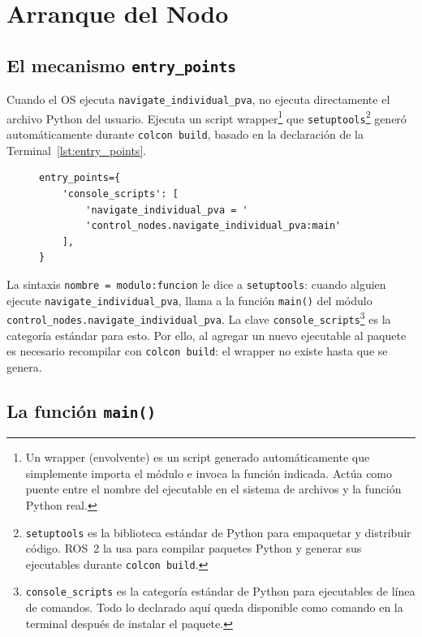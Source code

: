 \section{Arranque del Nodo}

\subsection{El mecanismo \texttt{entry\_points}}

Cuando el OS ejecuta \texttt{navigate\_individual\_pva}, no ejecuta directamente el archivo Python del usuario. Ejecuta un script wrapper\footnote{Un wrapper (envolvente) es un script generado automáticamente que simplemente importa el módulo e invoca la función indicada. Actúa como puente entre el nombre del ejecutable en el sistema de archivos y la función Python real.} que \texttt{setuptools}\footnote{\texttt{setuptools} es la biblioteca estándar de Python para empaquetar y distribuir código. ROS~2 la usa para compilar paquetes Python y generar sus ejecutables durante \texttt{colcon build}.} generó automáticamente durante \texttt{colcon build}, basado en la declaración de la Terminal~\ref{lst:entry_points}.

\begin{figure}[H]
\centering
\begin{lstlisting}[style=python, caption={Declaración del ejecutable en \texttt{setup.py}.}, label={lst:entry_points}]
entry_points={
    'console_scripts': [
        'navigate_individual_pva = '
        'control_nodes.navigate_individual_pva:main'
    ],
}
\end{lstlisting}
\end{figure}

La sintaxis \texttt{nombre = modulo:funcion} le dice a \texttt{setuptools}: cuando alguien ejecute \texttt{navigate\_individual\_pva}, llama a la función \texttt{main()} del módulo \texttt{control\_nodes.navigate\_individual\_pva}. La clave \texttt{console\_scripts}\footnote{\texttt{console\_scripts} es la categoría estándar de Python para ejecutables de línea de comandos. Todo lo declarado aquí queda disponible como comando en la terminal después de instalar el paquete.} es la categoría estándar para esto. Por ello, al agregar un nuevo ejecutable al paquete es necesario recompilar con \texttt{colcon build}: el wrapper no existe hasta que se genera.

\subsection{La función \texttt{main()}}

